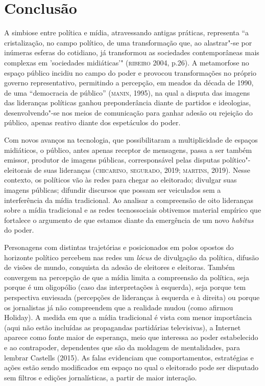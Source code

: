 \section{Conclusão}

\noindent{}A simbiose entre política e mídia, atravessando antigas práticas,
representa ``a cristalização, no campo político, de uma transformação
que, ao alastrar"-se por inúmeras esferas do cotidiano, já transformou as
sociedades contemporâneas mais complexas em 'sociedades midiáticas'"
(\textsc{ribeiro} 2004, p.26). A metamorfose no espaço público incidiu no campo
do poder e provocou transformações no próprio governo representativo,
permitindo a percepção, em meados da década de 1990, de uma ``democracia
de público'' (\textsc{manin}, 1995), na qual a disputa das imagens das lideranças
políticas ganhou preponderância diante de partidos e ideologias,
desenvolvendo"-se nos meios de comunicação para ganhar adesão ou rejeição
do público, apenas reativo diante dos espetáculos do poder.

Com novos avanços na tecnologia, que possibilitaram a multiplicidade de
espaços midiáticos, o público, antes apenas receptor de mensagens, passa
a ser também emissor, produtor de imagens públicas, corresponsável pelas
disputas político"-eleitorais de suas lideranças (\textsc{chicarino}, \textsc{segurado},
2019; \textsc{martins}, 2019). Nesse contexto, os políticos vão às redes para
chegar ao eleitorado; divulgar suas imagens públicas; difundir discursos
que possam ser veiculados sem a interferência da mídia tradicional. Ao
analisar a compreensão de oito lideranças sobre a mídia tradicional e as
redes tecnossociais obtivemos material empírico que fortalece o
argumento de que estamos diante da emergência de um novo \emph{habitus}
do poder.

Personagens com distintas trajetórias e posicionados em polos opostos do
horizonte político percebem nas redes um \emph{lócus} de divulgação da
política, difusão de visões de mundo, conquista da adesão de eleitores e
eleitoras. Também convergem na percepção de que a mídia limita a
compreensão da política, seja porque é um oligopólio (caso das
interpretações à esquerda), seja porque tem perspectiva enviesada
(percepções de lideranças à esquerda e à direita) ou porque os
jornalistas já não compreendem que a realidade mudou (como afirmou
Holiday). A medida em que a mídia tradicional é vista com menor
importância (aqui não estão incluídas as propagandas partidárias
televisivas), a Internet aparece como fonte maior de esperança, meio que
interessa ao poder estabelecido e ao contrapoder, dependentes que são da
moldagem de mentalidades, para lembrar Castells (2015). As falas
evidenciam que comportamentos, estratégias e ações estão sendo
modificados em espaço no qual o eleitorado pode ser disputado sem
filtros e edições jornalísticas, a partir de maior interação.

